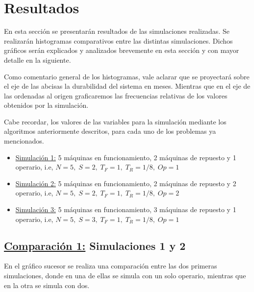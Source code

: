 \section{Resultados}

  \par En esta sección se presentarán resultados de las simulaciones realizadas. Se realizarán histogramas
  comparativos entre las distintas simulaciones. Dichos gráficos serán explicados y analizados brevemente en esta
  sección y con mayor detalle en la siguiente.

  \par Como comentario general de los histogramas, vale aclarar que se proyectará sobre el eje de las abcisas la
  durabilidad del sistema en meses. Mientras que en el eje de las ordenadas al origen graficaremos las frecuencias
  relativas de los valores obtenidos por la simulación.

  \par Cabe recordar, los valores de las variables para la simulación mediante los algoritmos anteriormente descritos,
  para cada uno de los problemas ya mencionados.

  \begin{itemize}
    \item \underline{Simulación 1:} 5 máquinas en funcionamiento, 2 máquinas de repuesto y 1 operario, i.e,
    $N = 5, \; S = 2, \; T_F = 1, \; T_R = 1/8, \; Op = 1$
    \item \underline{Simulación 2:} 5 máquinas en funcionamiento, 2 máquinas de repuesto y 2 operario, i.e,
    $N = 5, \; S = 2, \; T_F = 1, \; T_R = 1/8, \; Op = 2$
    \item \underline{Simulación 3:} 5 máquinas en funcionamiento, 3 máquinas de repuesto y 1 operario, i.e,
    $N = 5, \; S = 3, \; T_F = 1, \; T_R = 1/8, \; Op = 1$
  \end{itemize}

  \pagebreak
  \subsection{\underline{Comparación 1:} Simulaciones 1 y 2}

    \par En el gráfico sucesor se realiza una comparación entre las dos primeras simulaciones, donde en una de ellas
    se simula con un solo operario, mientras que en la otra se simula con dos.

